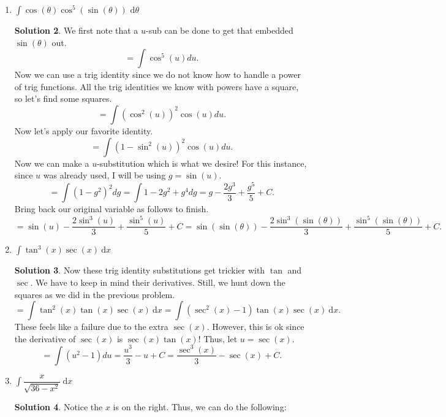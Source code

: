 \documentclass[10pt]{article}
\newcommand{\ds}{\displaystyle}
\newcommand{\dx}{\:\mathrm{d}x}
\theoremstyle{Theorem}
\theoremstyle{definition}
\newtheorem*{solution}{Solution}
\theoremstyle{remark}
\theoremstyle{custom}
\begin{document}
\begin{enumerate}[1.]
\begin{solution}
Notice the product of 2 trig functions with powers here. This is your hint to use trig identities.  However, your favorite trig identities do not leave you with a good $u$-sub after. Thus, we must resort to the half-angle identities. 
$$=\int \cos^2(x)\left(\dfrac{1-\cos(2x)}{2}\right)\dx=\dfrac{1}{4}\int (1+\cos(2x))(1-\cos(2x))\dx=\dfrac{1}{4}\int 1-\cos^2(2x)\dx$$
$$=\dfrac{1}{4}\int \dx-\dfrac{1}{8}\int 1+\cos(4x)\dx \text{ (Use the identity just the same as when it is only x but replace x with 2x)}$$
Now we can evaluate the integrals!
$$=\dfrac{x}{4}-\dfrac{x}{8}-\dfrac{\sin(4x)}{32}+C.$$
\end{solution}
\item $\ds \int \cos(\theta)\cos^5(\sin(\theta)) \text{ d}\theta$
\begin{solution}
We first note that a $u$-sub can be done to get that embedded $\sin(\theta)$ out.
$$=\int \cos^5(u) du.$$
Now we can use a trig identity since we do not know how to handle a power of trig functions. All the trig identities we know with powers have a square, so let's find some squares.
$$=\int (\cos^2(u))^2\cos(u)du.$$
Now let's apply our favorite identity.
$$=\int (1-\sin^2(u))^2 \cos(u)du.$$
Now we can make a $u$-substitution which is what we desire! For this instance, since $u$ was already used, I will be using $g=\sin(u)$.
$$=\int (1-g^2)^2dg=\int 1-2g^2+g^4 dg=g-\dfrac{2g^3}{3}+\dfrac{g^5}{5}+C.$$
Bring back our original variable as follows to finish.
$$=\sin(u)-\dfrac{2\sin^3(u)}{3}+\dfrac{\sin^5(u)}{5}+C=\sin(\sin(\theta))-\dfrac{2\sin^3(\sin(\theta))}{3}+\dfrac{\sin^5(\sin(\theta))}{5}+C.$$
\end{solution}
\item $\ds \int \tan^3(x) \sec(x) \dx$
\begin{solution}
Now these trig identity substitutions get trickier with $\tan$ and $\sec$.  We have to keep in mind their derivatives. Still, we hunt down the squares as we did in the previous problem.
$$=\int \tan^2(x) \tan(x)\sec(x) \dx=\int (\sec^2(x)-1)\tan(x)\sec(x) \dx.$$
These feels like a failure due to the extra $\sec(x)$. However, this is ok since the derivative of $\sec(x)$ is $\sec(x)\tan(x)$! Thus, let $u=\sec(x)$.
$$=\int (u^2-1)du=\dfrac{u^3}{3}-u+C=\dfrac{\sec^3(x)}{3}-\sec(x)+C.$$
\end{solution}
\item $\ds \int \dfrac{x}{\sqrt{36-x^2}}\dx$
\begin{solution}
Notice the $x$ is on the right. Thus, we can do the following:

\end{solution}
\end{enumerate}
\end{document}
